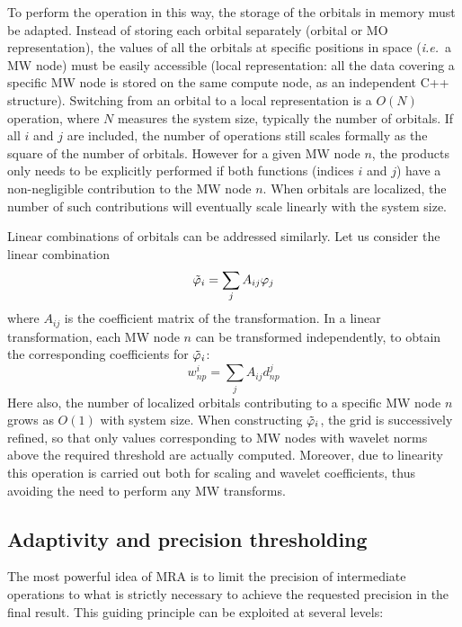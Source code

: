 \documentclass[journal=jctcce, manuscript=article]{achemso}
\begin{document}
To perform the operation in this way, the storage of the orbitals in memory must be adapted. Instead of storing each orbital separately (orbital or MO representation), the values of all the orbitals at specific positions in space (\emph{i.e.}~a \ac{MW} node) must be easily accessible (local representation: all the data covering a specific \ac{MW} node is stored on the same compute node, as an independent C++ structure). Switching from an orbital to a local representation is a $O(N)$ operation, where $N$ measures the system size, typically the number of orbitals.
If all $i$ and $j$ are included, the number of operations still scales formally as the square of the number of orbitals. However for a given \ac{MW} node $n$, the products only needs to be explicitly performed if both functions (indices $i$ and $j$) have a non-negligible contribution to the \ac{MW} node $n$. When orbitals are localized, the number of such contributions will eventually scale linearly with the system size.


Linear combinations of orbitals can be addressed similarly. Let us consider the linear combination
\begin{equation}
  \tilde{\varphi}_i = \sum_{j} A_{ij} \varphi_j
\end{equation}
where $A_{ij}$ is the coefficient matrix of the transformation.
In a linear transformation, each \ac{MW} node $n$ can be transformed independently, to obtain the corresponding coefficients for $\tilde{\varphi}_i$:
\begin{equation}
  w^i_{np} = \sum_{j} A_{ij} d^j_{np}
\end{equation}
Here also, the number of localized orbitals contributing to a specific \ac{MW} node $n$ grows as $O(1)$ with system size. 
When constructing $\tilde{\varphi}_i$, the grid is successively refined, so that only values corresponding to \ac{MW} nodes with wavelet norms above the required threshold are actually computed.
Moreover, due to linearity this operation is carried out both for scaling and wavelet coefficients, thus avoiding the need to perform any \ac{MW} transforms.

\subsection{Adaptivity and precision thresholding}\label{sec:adaptivity-screening}

The most powerful idea of \ac{MRA} is to limit the precision of intermediate operations to what is strictly necessary to achieve the requested precision in the final result. This guiding principle can be exploited at several levels:
\end{document}
